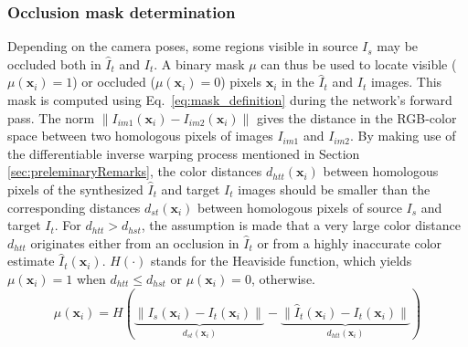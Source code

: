 \documentclass[a4paper,fleqn]{cas-dc}
\begin{document}
{\subsubsection{Occlusion mask determination}
%
Depending on the camera poses, some regions visible in source $I_s$ may be occluded both in $\hat{I}_t$ and $I_t$. A binary mask $\mu$ can thus be used to locate 
visible ($\mu(\mathbf{x}_i) = 1$) or occluded ($\mu(\mathbf{x}_i) = 0$) pixels $\mathbf{x}_i$ in the $\hat{I}_t$ and $I_t$ images.
%
This mask is computed using Eq.~\eqref{eq:mask_definition} during the network's forward pass. The norm $\left\|I_{im1}(\mathbf{x}_i) - I_{im2}(\mathbf{x}_i)\right\|$ gives the distance in the RGB-color space between two homo\-lo\-gous pixels of images $I_{im1}$ and $I_{im2}$. By making use of the differentiable inverse warping process mentioned in Section \ref{sec:preleminaryRemarks}, the color distances $d_{htt}(\mathbf{x}_i)$ between homologous pixels of the synthesized  $\hat{I}_t$ and target $I_t$ images should be smaller than the corresponding distances $d_{st}(\mathbf{x}_i)$ between homologous pixels of source $I_s$ and target $I_t$. For $d_{htt} > d_{hst}$, the assumption is made that a very large color distance $d_{htt}$ originates either from an occlusion in $\hat{I}_t$ or from a highly inaccurate color estimate $\hat{I}_{t}(\mathbf{x}_i)$. $H(\cdot)$ stands for the Heaviside function, which yields  $\mu(\mathbf{x}_i) = 1$ when $d_{htt} \leq d_{hst}$ or $\mu(\mathbf{x}_i) = 0$, otherwise.
%
\begin{equation} \label{eq:mask_definition} 
\mu(\mathbf{x}_i) =  H (\underbrace{\|I_s(\mathbf{x}_i) - I_t(\mathbf{x}_i)\|}_{d_{st}(\mathbf{x}_i)} - \underbrace{\|\hat{I}_t(\mathbf{x}_i) - I_t(\mathbf{x}_i)\|}_{d_{htt}(\mathbf{x}_i)})
\end{equation} 
%
%
}
\end{document}
